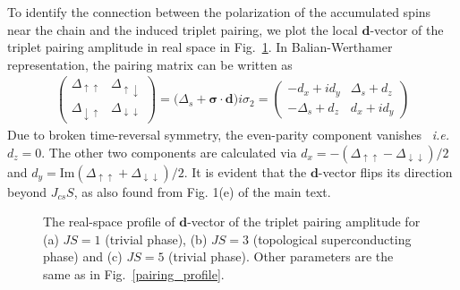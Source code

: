 \documentclass[aps,prl,reprint,nobibnotes]{revtex4-1}
\begin{document}
To identify the connection between the polarization of the accumulated spins near the chain and the induced triplet pairing, we plot the local $\mathbf{d}$-vector of the triplet pairing amplitude in real space in Fig.~\ref{dvector}. In Balian-Werthamer representation, the pairing matrix can be written as
\begin{align}
\begin{pmatrix} 
  \Delta_{\uparrow \uparrow}     & \Delta_{\uparrow \downarrow}\\ 
  \Delta_{\downarrow \uparrow} & \Delta_{\downarrow \downarrow} 
\end{pmatrix}
=\Big( \Delta_s + \boldsymbol{\sigma} \cdot \mathbf{d} \Big)i\sigma_2
=\begin{pmatrix} 
  -d_x+id_y     & \Delta_s+d_z\\ 
  -\Delta_s+d_z   & d_x+id_y 
\end{pmatrix}
\end{align}
Due to broken time-reversal symmetry, the even-parity component vanishes~\cite{Ebisuptep2016} \textit{i.e.} $d_z=0$. The other two components are calculated via $d_x=-(\Delta_{\uparrow \uparrow}-\Delta_{\downarrow \downarrow})/2$ and $d_y=\text{Im}(\Delta_{\uparrow \uparrow}+\Delta_{\downarrow \downarrow})/2$. It is evident that the $\mathbf{d}$-vector flips its direction beyond $J_{cs}S$, as also found from Fig. 1(e) of the main text.
\begin{figure}[htb!]
\begin{center}
\caption{The real-space profile of $\mathbf{d}$-vector of the triplet pairing amplitude for (a) $JS=1$ (trivial phase), (b) $JS=3$ (topological superconducting phase) and (c) $JS=5$ (trivial phase). Other parameters are the same as in Fig.~\ref{pairing_profile}.} 
\label{dvector}
\end{center}
\end{figure}


\newpage 
\end{document}
